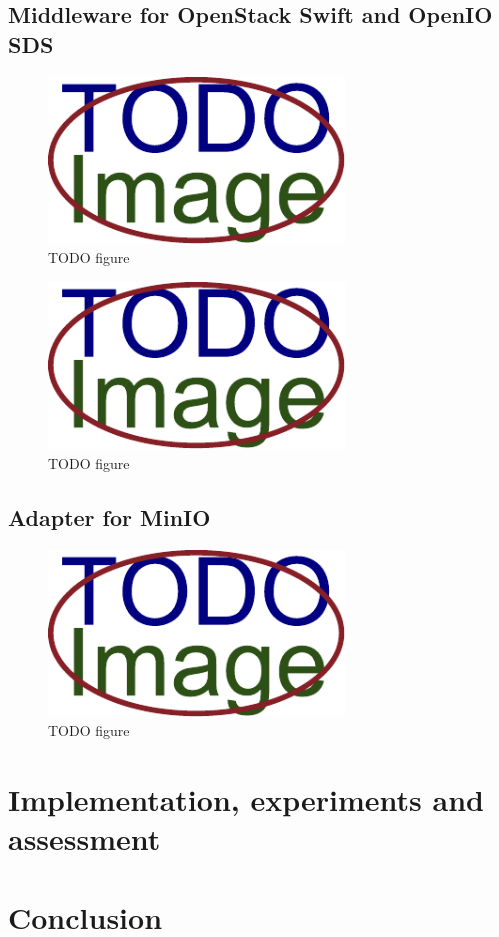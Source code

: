 \section{Middleware for OpenStack Swift and OpenIO SDS}
    \textcolor{gray}{\Blindtext}
    \begin{figure}[hbt]
        \centering
        \includegraphics[width=0.7\textwidth]{obrazky-figures/placeholder.pdf}
        \caption{TODO figure}
    \end{figure}
    \textcolor{gray}{\Blindtext}
    \begin{figure}[hbt]
        \centering
        \includegraphics[width=0.7\textwidth]{obrazky-figures/placeholder.pdf}
        \caption{TODO figure}
    \end{figure}
\section{Adapter for MinIO}
    \textcolor{gray}{\Blindtext}
    \begin{figure}[hbt]
        \centering
        \includegraphics[width=0.7\textwidth]{obrazky-figures/placeholder.pdf}
        \caption{TODO figure}
    \end{figure}

\chapter{Implementation, experiments and assessment}

\chapter{Conclusion}

